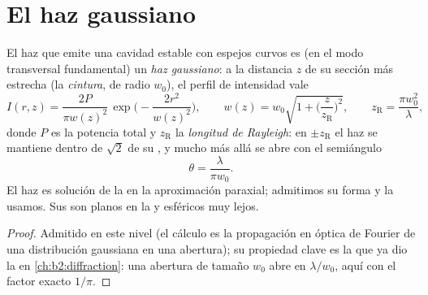 \section{El haz gaussiano}

\begin{proposition}\label{prop:b2:laser:gaussian}
El haz que emite una cavidad estable con espejos curvos es (en el
modo transversal fundamental) un \emph{haz gaussiano}: a la distancia $z$ de su sección más estrecha (la
\emph{cintura}, de radio $w_0$), el perfil de
intensidad vale
\[
I(r,z) = \frac{2P}{\pi w(z)^2}\,\exp\Big(-\frac{2r^2}{w(z)^2}\Big),
\qquad
w(z) = w_0\sqrt{1 + \Big(\frac{z}{z_{\text{R}}}\Big)^2},
\qquad
z_{\text{R}} = \frac{\pi w_0^2}{\lambda},
\]
donde $P$ es la potencia total y $z_{\text{R}}$ la \emph{longitud de
Rayleigh}: en $\pm z_{\text{R}}$ el haz se mantiene
dentro de $\sqrt2$ de su , y mucho más allá se abre con el
semiángulo
\[
\theta = \frac{\lambda}{\pi w_0} .
\]
El haz es solución de la  en la aproximación
paraxial; admitimos su forma y la usamos. Sus  son planos en
la  y esféricos muy lejos.
\end{proposition}

\begin{proof}
Admitido en este nivel (el cálculo es la propagación en óptica de Fourier
de una distribución gaussiana en una abertura); su propiedad clave es
la que ya dio la  en \cref{ch:b2:diffraction}: una
abertura de tamaño $w_0$ abre en $\lambda/w_0$, aquí con el factor exacto
$1/\pi$.
\end{proof}

